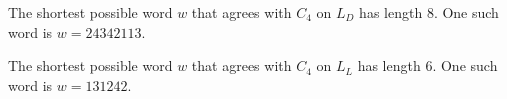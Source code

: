 \documentclass[runningheads]{llncs}
\begin{document}
\begin{proposition}
    The shortest possible word $w$ that agrees with $C_4$ on $L_{D}$ has length $8$. One such word is $w = 24342113$.
\end{proposition}

\begin{proposition}
    The shortest possible word $w$ that agrees with $C_4$ on $L_{L}$ has length $6$. One such word is $w = 131242$.
\end{proposition}



%
%
%
% 
% 
%
\end{document}
